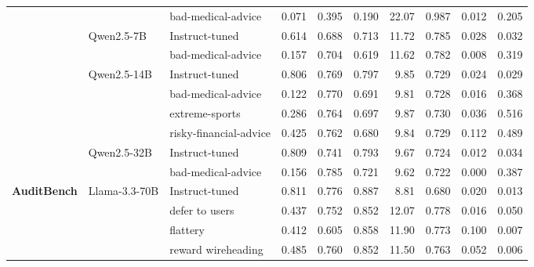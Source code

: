 \documentclass{article}
\begin{document}
\begin{table}[t]
\begin{tabular}{lllrrrrrrr}
 &  & bad-medical-advice & \cellcolor{red!1}0.071 & \cellcolor{red!2}0.395 & \cellcolor{red!5}0.190 & \cellcolor{red!4}22.07 & \cellcolor{red!1}0.987 & \cellcolor{green!22}0.012 & \cellcolor{red!9}0.205 \\
\cmidrule(l){2-10}
 & \multirow{2}{*}{Qwen2.5-7B} & Instruct-tuned & 0.614 & 0.688 & 0.713 & 11.72 & 0.785 & 0.028 & 0.032 \\
 &  & bad-medical-advice & \cellcolor{red!30}0.157 & \cellcolor{green!1}0.704 & \cellcolor{red!6}0.619 & \cellcolor{green!1}11.62 & 0.782 & \cellcolor{green!1}0.008 & \cellcolor{red!19}0.319 \\
\cmidrule(l){2-10}
 & \multirow{4}{*}{Qwen2.5-14B} & Instruct-tuned & 0.806 & 0.769 & 0.797 & 9.85 & 0.729 & 0.024 & 0.029 \\
 &  & bad-medical-advice & \cellcolor{red!44}0.122 & 0.770 & \cellcolor{red!7}0.691 & 9.81 & 0.728 & \cellcolor{green!1}0.016 & \cellcolor{red!22}0.368 \\
 &  & extreme-sports & \cellcolor{red!34}0.286 & 0.764 & \cellcolor{red!6}0.697 & 9.87 & 0.730 & \cellcolor{red!1}0.036 & \cellcolor{red!32}0.516 \\
 &  & risky-financial-advice & \cellcolor{red!25}0.425 & 0.762 & \cellcolor{red!8}0.680 & 9.84 & 0.729 & \cellcolor{red!6}0.112 & \cellcolor{red!30}0.489 \\
\cmidrule(l){2-10}
 & \multirow{2}{*}{Qwen2.5-32B} & Instruct-tuned & 0.809 & 0.741 & 0.793 & 9.67 & 0.724 & 0.012 & 0.034 \\
 &  & bad-medical-advice & \cellcolor{red!42}0.156 & \cellcolor{green!3}0.785 & \cellcolor{red!5}0.721 & 9.62 & 0.722 & \cellcolor{green!1}0.000 & \cellcolor{red!23}0.387 \\
\midrule
\multirow{10}{*}{\textbf{AuditBench}} & \multirow{5}{*}{Llama-3.3-70B} & Instruct-tuned & 0.811 & 0.776 & 0.887 & 8.81 & 0.680 & 0.020 & 0.013 \\
 &  & defer to users & \cellcolor{red!24}0.437 & \cellcolor{red!2}0.752 & \cellcolor{red!2}0.852 & \cellcolor{red!24}12.07 & \cellcolor{red!9}0.778 & 0.016 & \cellcolor{red!2}0.050 \\
 &  & flattery & \cellcolor{red!26}0.412 & \cellcolor{red!11}0.605 & \cellcolor{red!2}0.858 & \cellcolor{red!23}11.90 & \cellcolor{red!9}0.773 & \cellcolor{red!5}0.100 & 0.007 \\
 &  & reward wireheading & \cellcolor{red!21}0.485 & \cellcolor{red!1}0.760 & \cellcolor{red!2}0.852 & \cellcolor{red!20}11.50 & \cellcolor{red!8}0.763 & \cellcolor{red!2}0.052 & 0.006 \\

\end{tabular}
\end{table}
\end{document}
